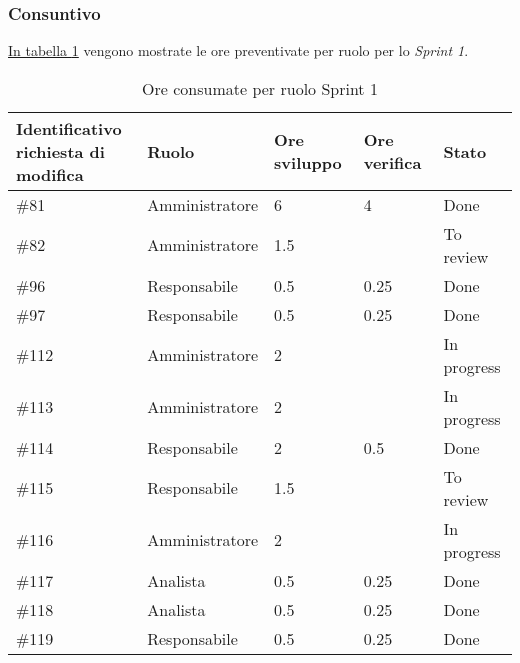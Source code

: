 \subsubsection{Consuntivo}

\hyperref[tab:sprint1_ore_consumate]{In tabella \ref{tab:sprint1_ore_consumate}} vengono mostrate le ore preventivate per ruolo per lo \textit{Sprint 1}.

\begin{table}[H]
    \centering
        \begin{tabular}{| l | l | l | l | l |}
            \hline
            \makecell{\textbf{Identificativo} \\ \textbf{richiesta di modifica}} &
                \textbf{Ruolo} & 
                \textbf{Ore sviluppo} &
                \textbf{Ore verifica} & 
                \textbf{Stato}\\ 
    \hline
        \#81 & Amministratore & 6 & 4 & Done\\
    \hline
        \#82 & Amministratore& 1.5 &  & To review\\
    \hline
        \#96 & Responsabile & 0.5 & 0.25 & Done\\
    \hline
        \#97 & Responsabile & 0.5 & 0.25 & Done\\
    \hline
        \#112 & Amministratore & 2 & & In progress\\
    \hline
        \#113 & Amministratore & 2 & & In progress\\
    \hline
        \#114 & Responsabile & 2 & 0.5 & Done\\
    \hline
        \#115 & Responsabile & 1.5 & & To review\\
    \hline
        \#116 & Amministratore & 2 & & In progress\\
    \hline
        \#117 & Analista & 0.5 & 0.25 & Done\\
    \hline
        \#118 & Analista & 0.5 & 0.25 & Done\\
    \hline
        \#119 & Responsabile & 0.5 & 0.25 & Done\\
    \hline
    \end{tabular}
    \caption{Ore consumate per ruolo Sprint 1}
    \label{tab:sprint1_ore_consumate} 
\end{table}